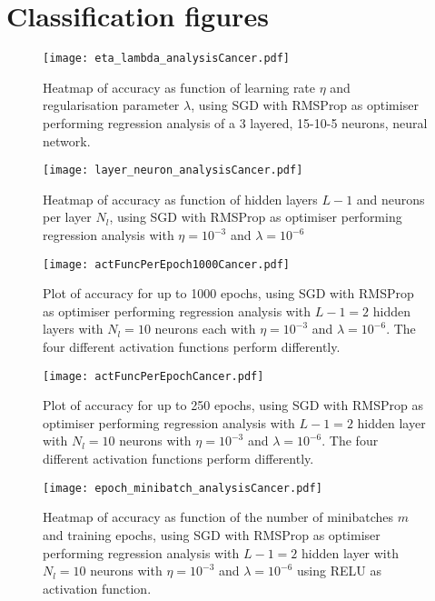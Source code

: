 \clearpage

\section{Classification figures}

\begin{figure}[h!]
    \texttt{[image: eta\_lambda\_analysisCancer.pdf]}
    \caption{Heatmap of accuracy as function of learning rate $\eta$ and regularisation parameter $\lambda$, using SGD with RMSProp as optimiser performing regression analysis of a 3 layered, 15-10-5 neurons, neural network. }
    \label{fig:class_eta_lambda}
\end{figure}

\begin{figure}[h!]
    \texttt{[image: layer\_neuron\_analysisCancer.pdf]}
    \caption{Heatmap of accuracy as function of hidden layers $L-1$ and neurons per layer $N_l$, using SGD with RMSProp as optimiser performing regression analysis with $\eta=10^{-3}$ and $\lambda=10^{-6}$ }
    \label{fig:class_layer_neuron}
\end{figure}

\begin{figure}[h!]
    \texttt{[image: actFuncPerEpoch1000Cancer.pdf]}
    \caption{Plot of accuracy for up to 1000 epochs, using SGD with RMSProp as optimiser performing regression analysis with $L-1=2$ hidden layers with $N_l=10$ neurons each with $\eta=10^{-3}$ and $\lambda=10^{-6}$. The four different activation functions perform differently.}
    \label{fig:class_act_epoch1000}
\end{figure}

\begin{figure}[h!]
    \texttt{[image: actFuncPerEpochCancer.pdf]}
    \caption{Plot of accuracy for up to 250 epochs, using SGD with RMSProp as optimiser performing regression analysis with $L-1=2$ hidden layer with $N_l=10$ neurons with $\eta=10^{-3}$ and $\lambda=10^{-6}$. The four different activation functions perform differently.}
    \label{fig:class_act_epoch}
\end{figure}

\begin{figure}[h!]
    \texttt{[image: epoch\_minibatch\_analysisCancer.pdf]}
    \caption{Heatmap of accuracy as function of the number of minibatches $m$ and training epochs, using SGD with RMSProp as optimiser performing regression analysis with $L-1=2$ hidden layer with $N_l=10$ neurons with $\eta=10^{-3}$ and $\lambda=10^{-6}$ using RELU as activation function. }
    \label{fig:class_minibatch_epoch}
\end{figure}


